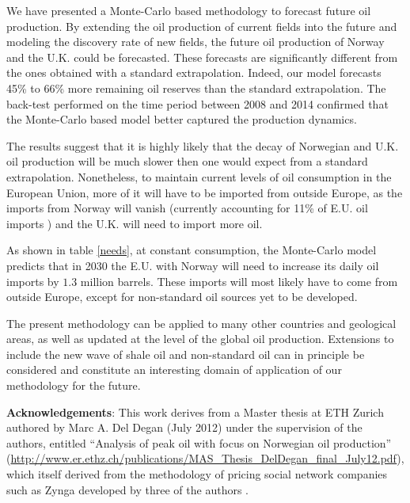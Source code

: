 \documentclass[review]{elsarticle}
\begin{document}
We have presented a Monte-Carlo based methodology to forecast future
oil production. By extending the oil production of current fields
into the future and modeling the discovery rate of new fields, the
future oil production of Norway and the U.K. could be forecasted.
These forecasts are significantly different from the ones obtained
with a standard extrapolation. Indeed, our model forecasts 45\% to
66\% more remaining oil reserves than the standard extrapolation.
The back-test performed on the time period between 2008 and 2014 confirmed
that the Monte-Carlo based model better captured the production dynamics.

The results suggest that it is highly likely that the decay
of Norwegian and U.K. oil production will be much slower then one
would expect from a standard extrapolation. Nonetheless, to maintain
current levels of oil consumption in the European Union, more of it
will have to be imported from outside Europe, as the imports from
Norway will vanish (currently accounting for 11\% of E.U. oil imports
) and the U.K. will need to import more
oil.

As shown in table \ref{needs}, at constant consumption, the Monte-Carlo
model predicts that in 2030 the E.U. with Norway will need to increase
its daily oil imports by $1.3$ million barrels. These imports will most
likely have to come from outside Europe, except for  
non-standard oil sources yet to be developed.


The present methodology can be applied to many other countries
and geological areas, as well as updated at the level of the global
oil production. Extensions to include the new wave of shale oil and
non-standard oil can in principle be considered and constitute
an interesting domain of application of our methodology for the future.


\vskip 0.5cm
\noindent
{\bf Acknowledgements}: This work derives from a Master thesis at ETH Zurich authored by 
Marc A. Del Degan (July 2012) under the supervision of the authors, 
entitled ``Analysis of peak oil with focus on Norwegian oil production''
(\url{http://www.er.ethz.ch/publications/MAS_Thesis_DelDegan_final_July12.pdf}), which
itself derived from the methodology of pricing social network companies such as Zynga developed
by three of the authors \cite{Forro2012}.






\newpage{}
\end{document}
